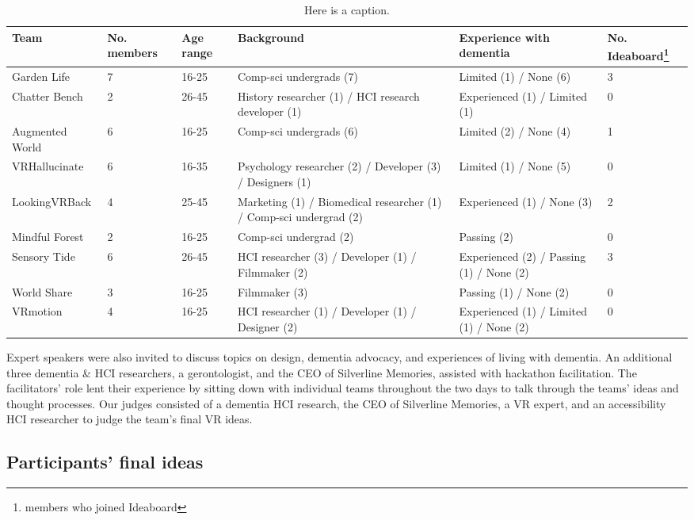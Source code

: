 \begin{table}[!ht]
\begin{tabularx}{\textwidth}{@{} YYYYYY @{}}
\hline
\textbf{Team} & \textbf{No. members} & \textbf{Age range} & \textbf{Background} & \textbf{Experience with dementia} & \textbf{No. Ideaboard\footnote{members who joined Ideaboard}} \\ \hline 
Garden Life & 7 & 16-25 & Comp-sci undergrads (7) & Limited (1) / None (6) & 3 \\ \hline
Chatter Bench & 2 & 26-45 & History researcher (1) / HCI research developer   (1) & Experienced (1) / Limited (1) & 0 \\ \hline
Augmented World & 6 & 16-25 & Comp-sci undergrads (6) & Limited (2) / None (4) & 1 \\ \hline
VRHallucinate & 6 & 16-35 & Psychology researcher (2) / Developer (3) /   Designers (1) & Limited (1) / None (5) & 0 \\ \hline
LookingVRBack & 4 & 25-45 & Marketing (1) / Biomedical researcher (1) /   Comp-sci undergrad (2) & Experienced (1) / None (3) & 2 \\ \hline
Mindful Forest & 2 & 16-25 & Comp-sci undergrad (2) & Passing (2) & 0 \\ \hline
Sensory Tide & 6 & 26-45 & HCI researcher (3) / Developer (1) / Filmmaker   (2) & Experienced (2) / Passing (1) / None (2) & 3 \\ \hline
World Share & 3 & 16-25 & Filmmaker (3) & Passing (1) / None (2) & 0 \\ \hline
VRmotion & 4 & 16-25 & HCI researcher (1) / Developer (1) / Designer   (2) & Experienced (1) / Limited (1) / None (2) & 0 \\ \hline
\end{tabularx}
\caption{Here is a caption.}
\label{table:DemVRDemographic}
\end{table}

Expert speakers were also invited to discuss topics on design, dementia advocacy, and experiences of living with dementia. An additional three dementia \& HCI researchers, a gerontologist, and the CEO of Silverline Memories, assisted with hackathon facilitation. The facilitators' role lent their experience by sitting down with individual teams throughout the two days to talk through the teams' ideas and thought processes. Our judges consisted of a dementia HCI research, the CEO of Silverline Memories, a VR expert, and an accessibility HCI researcher to judge the team's final VR ideas.

\subsection{Participants' final ideas}
\label{sec:EventIdeas}

